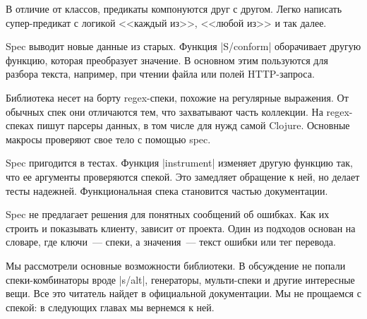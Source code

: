 В отличие от классов, предикаты компонуются друг с другом. Легко написать
супер-предикат с логикой <<каждый из>>, <<любой из>> и так далее.

Spec выводит новые данные из старых. Функция \spverb|S/conform| оборачивает
другую функцию, которая преобразует значение. В основном этим пользуются для
разбора текста, например, при чтении файла или полей HTTP-запроса.

Библиотека несет на борту regex-спеки, похожие на регулярные выражения. От
обычных спек они отличаются тем, что захватывают часть коллекции. На
regex-спеках пишут парсеры данных, в том числе для нужд самой Clojure. Основные
макросы проверяют свое тело с помощью spec.

Spec пригодится в тестах. Функция \spverb|instrument| изменяет другую функцию
так, что ее аргументы проверяются спекой. Это замедляет обращение к ней, но
делает тесты надежней. Функциональная спека становится частью документации.

Spec не предлагает решения для понятных сообщений об ошибках. Как их строить и
показывать клиенту, зависит от проекта. Один из подходов основан на словаре, где
ключи~--- спеки, а значения~--- текст ошибки или тег перевода.

Мы рассмотрели основные возможности библиотеки. В обсуждение не попали
спеки-комбинаторы вроде \spverb|s/alt|, генераторы, мульти-спеки и другие
интересные вещи. Все это читатель найдет в официальной документации. Мы не
прощаемся с спекой: в следующих главах мы вернемся к ней.
